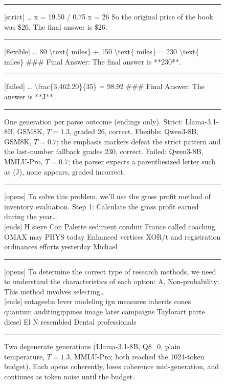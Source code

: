 \documentclass[11pt]{article}
\begin{document}
\begin{figure}[t]
\centering
\begin{minipage}{0.96\columnwidth}
\hrule\vspace{4pt}
{\small\ttfamily\raggedright
[strict] \ldots{} x = 19.50 / 0.75 \quad x = 26 \quad So the original price of the book
was \$26. \quad The final answer is \$26.
\par}
\vspace{4pt}\hrule\vspace{4pt}
{\small\ttfamily\raggedright
[flexible] \ldots{} 80 \textbackslash{}text\{ miles\} + 150 \textbackslash{}text\{ miles\}
= 230 \textbackslash{}text\{ miles\} \quad \#\#\# Final Answer: \quad The final answer is
**230**.
\par}
\vspace{4pt}\hrule\vspace{4pt}
{\small\ttfamily\raggedright
[failed] \ldots{} \textbackslash{}frac\{3,462.20\}\{35\} = 98.92 \quad \#\#\# Final
Answer: \quad The answer is **J**.
\par}
\vspace{4pt}\hrule
\end{minipage}
\caption{One generation per parse outcome (endings only). Strict: Llama-3.1-8B, GSM8K,
$T{=}1.3$, graded 26, correct. Flexible: Qwen3-8B, GSM8K, $T{=}0.7$; the emphasis markers defeat
the strict pattern and the last-number fallback grades 230, correct. Failed: Qwen3-8B, MMLU-Pro,
$T{=}0.7$; the parser expects a parenthesized letter such as (J), none appears, graded
incorrect.}
\label{fig:parsepaths}
\end{figure}

\begin{figure}[t]
\centering
\begin{minipage}{0.96\columnwidth}
\hrule\vspace{5pt}
{\small\ttfamily\raggedright
[opens] To solve this problem, we'll use the gross profit method of inventory
evaluation. Step 1: Calculate the gross profit earned during the year\ldots\\{}
[ends] H sieve Con Palette sediment conduit France called coaching OMAX may PHYS today
Enhanced vertices XOR/t and registration ordinances efforts yesterday Michael
\par}
\vspace{5pt}\hrule\vspace{5pt}
{\small\ttfamily\raggedright
[opens] To determine the correct type of research methods, we need to understand the
characteristics of each option: A. Non-probability: This method involves
selecting\ldots\\{}
[ends] entageeba lever modeling ign measures inherits cones quantum auditing\-ippines
image later campaigns Taylorart parte diesel El N resembled Dental professionals
\par}
\vspace{5pt}\hrule
\end{minipage}
\caption{Two degenerate generations (Llama-3.1-8B, Q8\_0, plain temperature, $T{=}1.3$,
MMLU-Pro; both reached the 1024-token budget). Each opens coherently, loses coherence
mid-generation, and continues as token noise until the budget.}
\label{fig:degenexamples}
\end{figure}
\end{document}
